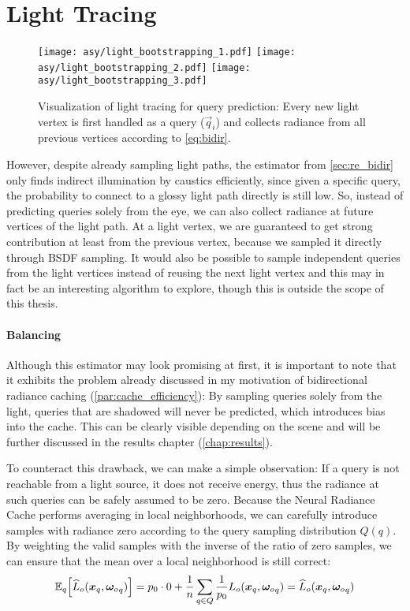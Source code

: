 \section{Light Tracing}
\label{sec:light_tracing}
\begin{figure}[ht]
    \centering
    \texttt{[image: asy/light\_bootstrapping\_1.pdf]}
    \texttt{[image: asy/light\_bootstrapping\_2.pdf]}
    \texttt{[image: asy/light\_bootstrapping\_3.pdf]}
    \caption{Visualization of light tracing for query prediction: Every new light vertex is first handled as a query ($\vec{q}_i$) and collects radiance from all previous vertices according to \autoref{eq:bidir}.}
    \label{fig:light_bootstrap}
\end{figure}
However, despite already sampling light paths, the estimator from \autoref{sec:re_bidir} only finds indirect illumination by caustics efficiently, since given a specific query, the probability to connect to a glossy light path directly is still low.
So, instead of predicting queries solely from the eye, we can also collect radiance at future vertices of the light path.
At a light vertex, we are guaranteed to get strong contribution at least from the previous vertex, because we sampled it directly through BSDF sampling.
It would also be possible to sample independent queries from the light vertices instead of reusing the next light vertex and this may in fact be an interesting algorithm to explore, though this is outside the scope of this thesis.

\paragraph{Balancing} Although this estimator may look promising at first, it is important to note that it exhibits the problem already discussed in my motivation of bidirectional radiance caching (\autoref{par:cache_efficiency}):
By sampling queries solely from the light, queries that are shadowed will never be predicted, which introduces bias into the cache.
This can be clearly visible depending on the scene and will be further discussed in the results chapter (\autoref{chap:results}).

To counteract this drawback, we can make a simple observation:
If a query is not reachable from a light source, it does not receive energy, thus the radiance at such queries can be safely assumed to be zero.
Because the Neural Radiance Cache performs averaging in local neighborhoods, we can carefully introduce samples with radiance zero according to the query sampling distribution $Q(q)$.
By weighting the valid samples with the inverse of the ratio of zero samples, we can ensure that the mean over a local neighborhood is still correct:
\begin{equation}
\expectationvar{q}{{\widehat{L}_o}(\vec{x}_q, \wo_q)} = p_0 \cdot 0 + \frac{1}{n} \sum_{q \in Q} \frac{1}{p_0} L_o(\vec{x}_q, \wo_q) = \widehat{L}_o(\vec{x}_q, \wo_q)
\end{equation}

